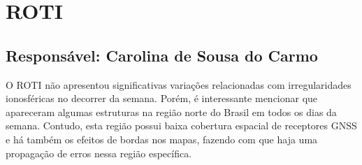 \documentclass[11pt, oneside]{article}
\begin{document}
    \section{ROTI} 
 \subsection{Responsável: Carolina de Sousa do Carmo} 
 
O ROTI não apresentou significativas variações relacionadas com irregularidades ionosféricas no decorrer da semana. Porém, é interessante mencionar que apareceram algumas estruturas na região norte do Brasil em todos os dias da semana. Contudo, esta região possui baixa cobertura espacial de receptores GNSS e há também os efeitos de bordas nos mapas, fazendo com que haja uma propagação de erros nessa região específica.
\end{document}

